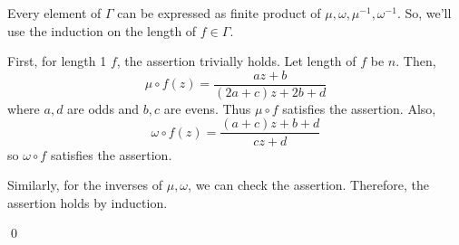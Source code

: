 \begin{problem}[10.3] \hfill

	Every element of $\Gamma$ can be expressed as finite product of $\mu, \omega, \mu^{-1}, \omega^{-1}$.
	So, we'll use the induction on the length of $f \in \Gamma$.

	First, for length 1 $f$, the assertion trivially holds.
	Let length of $f$ be $n$. Then,
	\[ 
		\mu \circ f (z) = \frac{az + b}{(2a+c)z + 2b+d}
	\]
	where $a, d$ are odds and $b, c$ are evens.
	Thus $\mu \circ f$ satisfies the assertion.
	Also, 
	\[
		\omega \circ f (z) = \frac{(a+c)z + b+d}{cz + d}
	\]
	so $\omega \circ f$ satisfies the assertion.

	Similarly, for the inverses of $\mu, \omega$, we can check the assertion.
	Therefore, the assertion holds by induction.

	\qed
	
\end{problem}

